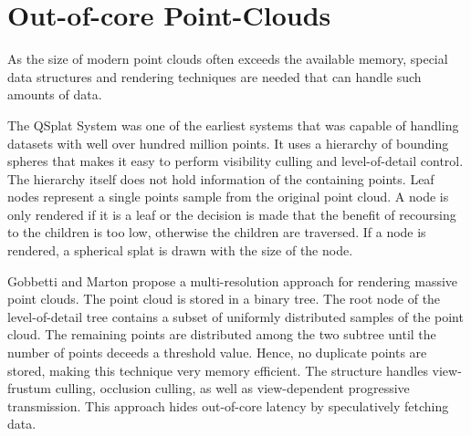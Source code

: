 \section {Out-of-core Point-Clouds}
\label{sec:related_work_point_clouds}
As the size of modern point clouds often exceeds the available memory, special data structures and rendering techniques are needed that can handle such amounts of data. 

The QSplat System \cite{rusinkiewicz2000qsplat} was one of the earliest systems that was capable of handling datasets with well over hundred million points. It uses a hierarchy of bounding spheres that makes it easy to perform visibility culling and level-of-detail control. The hierarchy itself does not hold information of the containing points. Leaf nodes represent a single points sample from the original point cloud. A node is only rendered if it is a leaf or the decision is made that the benefit of recoursing to the children is too low, otherwise the children are traversed. If a node is rendered, a spherical splat is drawn with the size of the node. 

\par

Gobbetti and Marton \cite{gobbetti2004layered} propose a multi-resolution approach for rendering massive point clouds. The point cloud is stored in a binary tree. The root node of the level-of-detail tree contains a subset of uniformly distributed samples of the point cloud. The remaining points are distributed among the two subtree until the number of points deceeds a threshold value. Hence, no duplicate points are stored, making this technique very memory efficient. The structure handles view-frustum culling, occlusion culling, as well as view-dependent progressive transmission. This approach hides out-of-core latency by speculatively fetching data. 

\par

